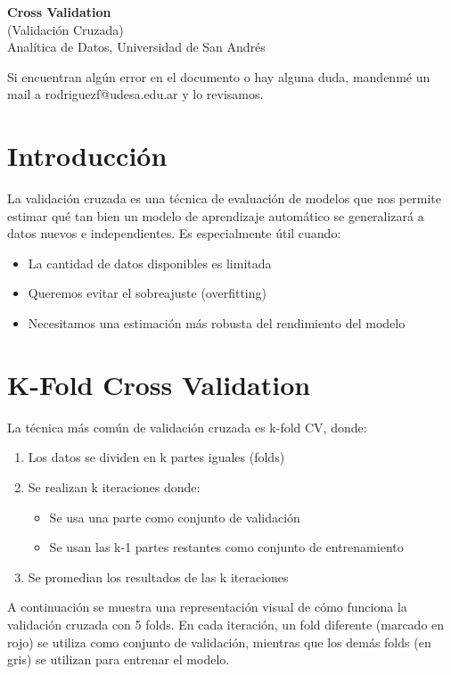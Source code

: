 \documentclass[12pt]{article}
\begin{document}
\begin{center}
  {\LARGE \textbf{Cross Validation}}\\[0.5em]
  {\normalsize (Validación Cruzada)}\\[0.5em]
  {Analítica de Datos, Universidad de San Andrés}
\end{center}

Si encuentran algún error en el documento o hay alguna duda, mandenmé un mail a rodriguezf@udesa.edu.ar y lo revisamos.

\section{Introducción}
La validación cruzada es una técnica de evaluación de modelos que nos permite estimar qué tan bien un modelo de aprendizaje automático se generalizará a datos nuevos e independientes. Es especialmente útil cuando:
\begin{itemize}
    \item La cantidad de datos disponibles es limitada
    \item Queremos evitar el sobreajuste (overfitting)
    \item Necesitamos una estimación más robusta del rendimiento del modelo
\end{itemize}

\section{K-Fold Cross Validation}
La técnica más común de validación cruzada es k-fold CV, donde:
\begin{enumerate}
    \item Los datos se dividen en k partes iguales (folds)
    \item Se realizan k iteraciones donde:
        \begin{itemize}
            \item Se usa una parte como conjunto de validación
            \item Se usan las k-1 partes restantes como conjunto de entrenamiento
        \end{itemize}
    \item Se promedian los resultados de las k iteraciones
\end{enumerate}

A continuación se muestra una representación visual de cómo funciona la validación cruzada con 5 folds. En cada iteración, un fold diferente (marcado en rojo) se utiliza como conjunto de validación, mientras que los demás folds (en gris) se utilizan para entrenar el modelo.
\end{document}
